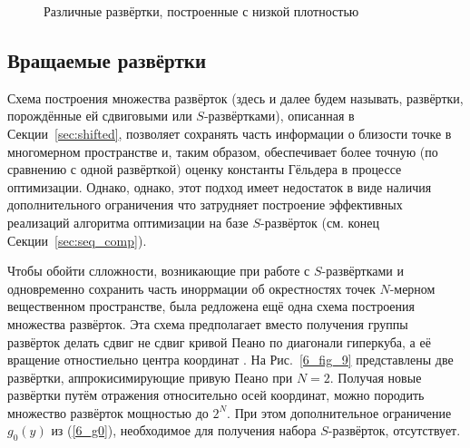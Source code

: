 \begin{figure}[ht]
    \centering
    \caption{Различные развёртки, построенные с низкой плотностью}
\end{figure}

\subsection{Вращаемые развёртки}
Схема построения множества развёрток (здесь и далее будем называть, развёртки, порождённые ей сдвиговыми
или $S$-развёртками), описанная в Секции~\ref{sec:shifted}, позволяет сохранять часть информации
о близости точке в многомерном пространстве и, таким образом, обеспечивает более точную (по сравнению с одной развёрткой)
оценку константы Гёльдера в процессе оптимизации. Однако, однако, этот подход имеет недостаток в виде наличия дополнительного ограничения
что затрудняет построение эффективных реализаций алгоритма оптимизации на базе $S$-развёрток (см. конец Секции~\ref{sec:seq_comp}).

Чтобы обойти слложности, возникающие при работе с $S$-развёртками и одновременно сохранить часть иноррмации об окрестностях точек
$N$-мерном вещественном пространстве, была редложена ещё одна схема построения множества развёрток.
Эта схема предполагает вместо получения группы развёрток делать сдвиг не сдвиг кривой Пеано по диагонали гиперкуба, а
её вращение отностиельно центра координат \cite{Gergel2009}.
На Рис.~\ref{6_fig_9} представлены две развёртки, аппрокисимирующие привую Пеано при $N=2$.
Получая новые развёртки путём отражения относительно осей координат, можно породить множество развёрток
мощностью до $2^N$. При этом дополнительное ограничение $g_0(y)$ из (\ref{6_g0}), необходимое для получения
набора $S$-развёрток, отсутствует.

